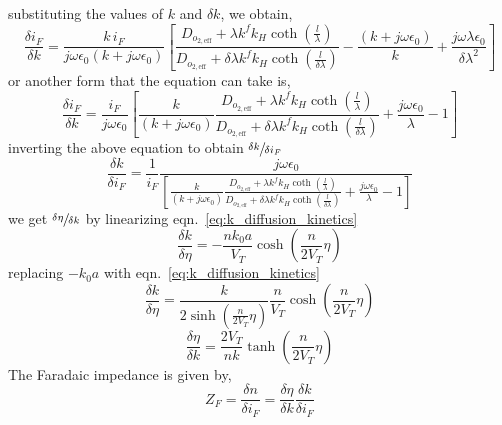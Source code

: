 \documentclass[Notes.tex]{subfiles}
\begin{document}
substituting the values of $k$ and $\delta k$, we obtain,
\begin{equation}
	\frac{\delta i_F}{\delta k} = \frac{k\,i_F}{j\omega\epsilon_0 {\left(k+j\omega\epsilon_0\right)}}	\left[\frac{D_{o_{2,\textrm{eff}}} + \lambda k^f k_H\coth{\left(\frac{l}{\lambda}\right)} } {D_{o_{2,\textrm{eff}}} + \delta\lambda k^f k_H \coth{\left(\frac{l}{\delta\lambda}\right)} } - \frac{\left(k+j\omega\epsilon_0\right)}{k} + \frac{j\omega\lambda\epsilon_0}{\delta\lambda^2} \right]\nonumber
\end{equation}
or another form that the equation can take is,
\begin{equation}
	\frac{\delta i_F}{\delta k} = \frac{i_F}{j\omega\epsilon_0}\left[ \frac{k}{\left(k+j\omega\epsilon_0\right)} \frac{D_{o_{2,\textrm{eff}}} + \lambda k^f k_H\coth{\left(\frac{l}{\lambda}\right)}}{D_{o_{2,\textrm{eff}}} + \delta\lambda k^f k_H \coth{\left(\frac{l}{\delta\lambda}\right)}} + \frac{j\omega\epsilon_0}{\lambda} - 1 \right]\nonumber 
\end{equation}
inverting the above equation to obtain $\sfrac{\delta k}{\delta i_F}$
\begin{equation}
\frac{\delta k}{\delta i_F} = \frac{1}{i_F}
\frac{j\omega\epsilon_0}{\left[
	\frac{k}{\left(k+j\omega\epsilon_0\right)}
	\frac{D_{o_{2,\textrm{eff}}} + \lambda k^f k_H\coth{\left(\frac{l}{\lambda}\right)}}
	{D_{o_{2,\textrm{eff}}} + \delta\lambda k^f k_H \coth{\left(\frac{l}{\delta\lambda}\right)}}
	+ \frac{j\omega\epsilon_0}{\lambda} - 1 
	\right]}\label{eq:dk_di_diffusion_kinetics}
\end{equation}
we get $\sfrac{\delta\eta}{\delta k}$ by linearizing eqn.~\ref{eq:k_diffusion_kinetics}
\begin{equation}
	\frac{\delta k}{\delta\eta} = - \frac{nk_0a}{V_T}\cosh{\left(\frac{n}{2V_T}\eta\right)}\nonumber
\end{equation}
replacing $-k_0a$ with eqn.~\ref{eq:k_diffusion_kinetics}
\begin{equation}
	\frac{\delta k}{\delta\eta} = \frac{k}{2\sinh{\left(\frac{n}{2V_T}\eta\right)}} \frac{n}{V_T}\cosh{\left(\frac{n}{2V_T}\eta\right)}\nonumber
\end{equation}
\begin{equation}
	\frac{\delta\eta}{\delta k} = \frac{2V_T}{nk}\tanh{\left(\frac{n}{2V_T}\eta\right)}\label{eq:dn_dk_diffusion_kinetics}
\end{equation}
The Faradaic impedance is given by,
\begin{equation}
	Z_F = \frac{\delta n}{\delta i_F} = \frac{\delta\eta}{\delta k}\frac{\delta k}{\delta i_F}
\end{equation}
\end{document}
